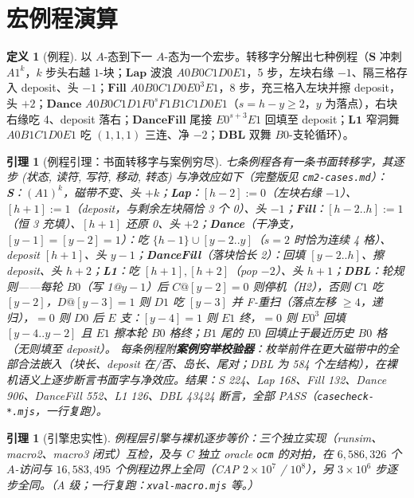 \documentclass[11pt]{ctexart}
\newtheorem{lemma}[theorem]{引理}
\theoremstyle{definition}
\newtheorem{definition}[theorem]{定义}
\begin{document}
\section{宏例程演算}

\begin{definition}[例程]\label{def:routine}
以 $A$-态到下一 $A$-态为一个宏步。转移字分解出七种例程（$\mathbf{S}$ 冲刺 $A1^k$，$k$ 步头右越 $1$-块；$\mathbf{Lap}$ 波浪 $A0B0C1D0E1$，5 步，左块右缘 $-1$、隔三格存入 deposit、头 $-1$；$\mathbf{Fill}$ $A0B0C1D0E0^3E1$，8 步，充三格入左块并擦 deposit，头 $+2$；$\mathbf{Dance}$ $A0B0C1D1F0^sF1B1C1D0E1$（$s=h{-}y\ge2$，$y$ 为落点），右块右缘吃 4、deposit 落右；$\mathbf{DanceFill}$ 尾接 $E0^{s+3}E1$ 回填至 deposit；$\mathbf{L1}$ 窄洞舞 $A0B1C1D0E1$ 吃 $(1,1,1)$ 三连、净 $-2$；$\mathbf{DBL}$ 双舞 $B0$-支轮循环）。
\end{definition}

\begin{lemma}[例程引理：书面转移字与案例穷尽]\label{lem:words}
七条例程各有一条书面转移字，其逐步 (状态, 读符, 写符, 移动, 转态) 与净效应如下（完整版见 \texttt{cm2-cases.md}）：
\textbf{S}：$(A1)^k$，磁带不变、头 $+k$；\textbf{Lap}：$[h{-}2]{:=}0$（左块右缘 $-1$）、$[h{+}1]{:=}1$（deposit，与剩余左块隔恰 3 个 0）、头 $-1$；\textbf{Fill}：$[h{-}2..h]{:=}1$（恒 3 充填）、$[h{+}1]$ 还原 0、头 $+2$；\textbf{Dance}（干净支，$[y{-}1]{=}[y{-}2]{=}1$）：吃 $\{h{-}1\}\cup[y{-}2..y]$（$s{=}2$ 时恰为连续 4 格）、deposit $[h{+}1]$、头 $y{-}1$；\textbf{DanceFill}（落块恰长 2）：回填 $[y{-}2..h]$、擦 deposit、头 $h{+}2$；\textbf{L1}：吃 $[h{+}1],[h{+}2]$（pop $-2$）、头 $h{+}1$；\textbf{DBL}：轮规则——每轮 $B0$（写 1@$y{-}1$）后 $C@[y{-}2]{=}0$ 则停机（H2），否则 $C1$ 吃 $[y{-}2]$，$D@[y{-}3]{=}1$ 则 $D1$ 吃 $[y{-}3]$ 并 F-重扫（落点左移 $\ge4$，递归），$=0$ 则 $D0$ 后 $E$ 支：$[y{-}4]{=}1$ 则 $E1$ 终，$=0$ 则 $E0^3$ 回填 $[y{-}4..y{-}2]$ 且 $E1$ 擦本轮 $B0$ 格终；$B1$ 尾的 $E0$ 回填止于最近历史 $B0$ 格（无则填至 deposit）。
每条例程附\textbf{案例穷举校验器}：枚举前件在更大磁带中的全部合法嵌入（块长、deposit 在/否、岛长、尾对；DBL 为 584 个左结构），在裸机语义上逐步断言书面字与净效应。结果：S 224、Lap 168、Fill 132、Dance 906、DanceFill 552、L1 126、DBL 43424 断言，全部 PASS（\texttt{casecheck-*.mjs}，一行复跑）。
\end{lemma}

\begin{lemma}[引擎忠实性]\label{lem:engine}
例程层引擎与裸机逐步等价：三个独立实现（runsim、macro2、macro3 闭式）互检，及与 C 独立 oracle \texttt{ocm} 的对拍，在 $6{,}586{,}326$ 个 $A$-访问与 $16{,}583{,}495$ 个例程边界上全同（CAP $2\times10^7$ / $10^8$），另 $3\times10^6$ 步逐步全同。（A 级；一行复跑：\texttt{xval-macro.mjs} 等。）
\end{lemma}
\end{document}
